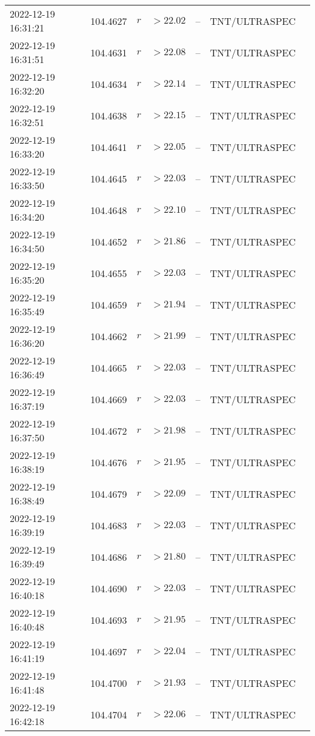 \documentclass{nature_plusfigure}
\begin{document}
\begin{supplement}
\begin{center}
\begin{longtable}{lllllll}
2022-12-19 16:31:21 & 104.4627 & $r$ & $>22.02$ & -- & TNT/ULTRASPEC &  \\ 
2022-12-19 16:31:51 & 104.4631 & $r$ & $>22.08$ & -- & TNT/ULTRASPEC &  \\ 
2022-12-19 16:32:20 & 104.4634 & $r$ & $>22.14$ & -- & TNT/ULTRASPEC &  \\ 
2022-12-19 16:32:51 & 104.4638 & $r$ & $>22.15$ & -- & TNT/ULTRASPEC &  \\ 
2022-12-19 16:33:20 & 104.4641 & $r$ & $>22.05$ & -- & TNT/ULTRASPEC &  \\ 
2022-12-19 16:33:50 & 104.4645 & $r$ & $>22.03$ & -- & TNT/ULTRASPEC &  \\ 
2022-12-19 16:34:20 & 104.4648 & $r$ & $>22.10$ & -- & TNT/ULTRASPEC &  \\ 
2022-12-19 16:34:50 & 104.4652 & $r$ & $>21.86$ & -- & TNT/ULTRASPEC &  \\ 
2022-12-19 16:35:20 & 104.4655 & $r$ & $>22.03$ & -- & TNT/ULTRASPEC &  \\ 
2022-12-19 16:35:49 & 104.4659 & $r$ & $>21.94$ & -- & TNT/ULTRASPEC &  \\ 
2022-12-19 16:36:20 & 104.4662 & $r$ & $>21.99$ & -- & TNT/ULTRASPEC &  \\ 
2022-12-19 16:36:49 & 104.4665 & $r$ & $>22.03$ & -- & TNT/ULTRASPEC &  \\ 
2022-12-19 16:37:19 & 104.4669 & $r$ & $>22.03$ & -- & TNT/ULTRASPEC &  \\ 
2022-12-19 16:37:50 & 104.4672 & $r$ & $>21.98$ & -- & TNT/ULTRASPEC &  \\ 
2022-12-19 16:38:19 & 104.4676 & $r$ & $>21.95$ & -- & TNT/ULTRASPEC &  \\ 
2022-12-19 16:38:49 & 104.4679 & $r$ & $>22.09$ & -- & TNT/ULTRASPEC &  \\ 
2022-12-19 16:39:19 & 104.4683 & $r$ & $>22.03$ & -- & TNT/ULTRASPEC &  \\ 
2022-12-19 16:39:49 & 104.4686 & $r$ & $>21.80$ & -- & TNT/ULTRASPEC &  \\ 
2022-12-19 16:40:18 & 104.4690 & $r$ & $>22.03$ & -- & TNT/ULTRASPEC &  \\ 
2022-12-19 16:40:48 & 104.4693 & $r$ & $>21.95$ & -- & TNT/ULTRASPEC &  \\ 
2022-12-19 16:41:19 & 104.4697 & $r$ & $>22.04$ & -- & TNT/ULTRASPEC &  \\ 
2022-12-19 16:41:48 & 104.4700 & $r$ & $>21.93$ & -- & TNT/ULTRASPEC &  \\ 
2022-12-19 16:42:18 & 104.4704 & $r$ & $>22.06$ & -- & TNT/ULTRASPEC &  \\ 

\end{longtable}
\end{center}
\end{supplement}
\end{document}
